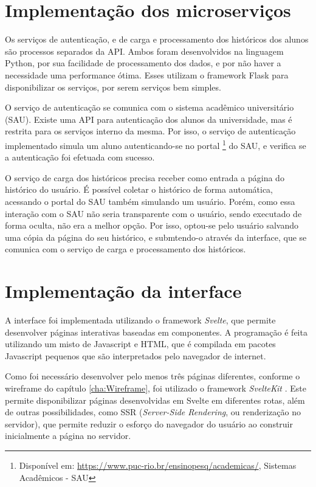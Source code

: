 \section{Implementação dos microserviços}
\label{sec:Implementação dos microserviços}

Os serviços de autenticação, e de carga e processamento dos históricos dos alunos são processos separados da API. Ambos foram desenvolvidos na linguagem Python, por sua facilidade de processamento dos dados, e por não haver a necessidade uma performance ótima. Esses utilizam o framework Flask para disponibilizar os serviços, por serem serviços bem simples.

O serviço de autenticação se comunica com o sistema acadêmico universitário (SAU). Existe uma API para autenticação dos alunos da universidade, mas é restrita para os serviços interno da mesma. Por isso, o serviço de autenticação implementado simula um aluno autenticando-se no portal \footnote{Disponível em: \url{https://www.puc-rio.br/ensinopesq/academicas/}, Sistemas Acadêmicos - SAU} do SAU, e verifica se a autenticação foi efetuada com sucesso.

O serviço de carga dos históricos precisa receber como entrada a página do histórico do usuário. É possível coletar o histórico de forma automática, acessando o portal do SAU também simulando um usuário. Porém, como essa interação com o SAU não seria transparente com o usuário, sendo executado de forma oculta, não era a melhor opção. Por isso, optou-se pelo usuário salvando uma cópia da página do seu histórico, e submtendo-o através da interface, que se comunica com o serviço de carga e processamento dos históricos. 

\section{Implementação da interface}
\label{sec:Implementação da interface}

A interface foi implementada utilizando o framework \textit{Svelte}, que permite desenvolver páginas interativas baseadas em componentes. A programação é feita utilizando um misto de Javascript e HTML, que é compilada em pacotes Javascript pequenos que são interpretados pelo navegador de internet. 

Como foi necessário desenvolver pelo menos três páginas diferentes, conforme o wireframe do capítulo \ref{cha:Wireframe}, foi utilizado o framework \textit{SvelteKit} \cite{site-sveltekit}. Este permite disponibilizar páginas desenvolvidas em Svelte em diferentes rotas, além de outras possibilidades, como SSR (\textit{Server-Side Rendering}, ou renderização no servidor), que permite reduzir o esforço do navegador do usuário ao construir inicialmente a página no servidor. 

